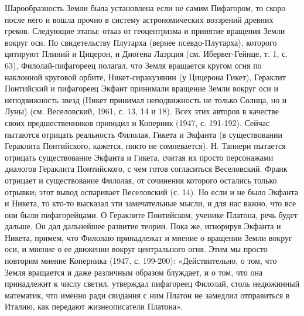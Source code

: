 Шарообразность Земли была установлена если не самим Пифагором, то
скоро после него и вошла прочно в систему астрономических воззрений
древних греков. Следующие этапы: отказ от геоцентризма и принятие
вращения Земли вокруг оси. По свидетельству Плутарха (вернее
псевдо-Плутарха), которого цитируют Плиний и Цицерон, и Диогена
Лаэрция (см. Ибервег-Гейнце, т. 1, с. 63), Филолай-пифагореец полагал,
что Земля вращается кругом огня по наклонной круговой орбите,
Никет-сиракузянин (у Цицерона Гикет), Гераклит Понтийский и пифагореец
Экфант принимали вращение Земли вокруг оси и неподвижность звезд
(Никет принимал неподвижность не только Солнца, но и Луны) (см.
Веселовский, 1961, с. 13, 14 и 18). Всех этих авторов в качестве своих
предшественников приводил и Коперник (1947, с. 191-192). Сейчас
пытаются отрицать реальность Филолая, Гикета и Экфанта (в
существовании Гераклита Понтийского, кажется, никто не сомневается).
Н. Таннери пытается отрицать существование Экфанта и Гикета, считая их
просто персонажами диалогов Гераклита Понтийского, с чем готов
согласиться Веселовский. Франк отрицает и существование Филолая, от
сочинения которого остались только отрывки; этот вывод оспаривает
Веселовский (с. 14). Но если и не было Экфанта и Никета, то кто-то
высказал эти замечательные мысли, и для нас важно, что все они были
пифагорейцами. О Гераклите Понтийском, ученике Платона, речь будет
дальше. Он дал дальнейшее развитие теории. Пока же, игнорируя Экфанта
и Никета, примем, что Филолаю принадлежат и мнение о вращении Земли
вокруг оси, и мнение о ее движении вокруг центрального огня. Этим мы
просто повторим мнение Коперника (1947, с. 199-200): «Действительно, о
том, что Земля вращается и даже различным образом блуждает, и о том,
что она принадлежит к числу светил, утверждал пифагореец Филолай,
столь недюжинный математик, что именно ради свидания с ним Платон не
замедлил отправиться в Италию, как передают жизнеописатели Платона».

